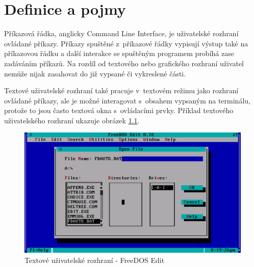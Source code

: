 \documentclass[thesis=M,czech]{FITthesis}[2012/06/26]
\begin{document}
\begin{introduction}



\end{introduction}

\chapter{Definice a pojmy}

Příkazová řádka, anglicky Command Line Interface, je uživatelské rozhraní ovládané příkazy. Příkazy spuštěné z~příkazové řádky vypisují výstup také na příkazovou řádku a další interakce se spuštěným programem probíhá zase zadáváním příkazů. Na rozdíl od textového nebo grafického rozhraní uživatel nemůže nijak zasahovat do již vypsané či vykreslené části.

Textové uživatelské rozhraní také pracuje v~textovém režimu jako rozhraní ovládané příkazy, ale je možné interagovat s~obsahem vypsaným na terminálu, protože to jsou často textová okna s~ovládacími prvky. Příklad textového uživatelského rozhraní ukazuje obrázek \ref{fig:tui}.

\begin{figure}
	\includegraphics[width=1.0\textwidth]{./images/TUI}
	\caption{Textové uživatelské rozhraní - FreeDOS Edit \cite{fdedit}}
	\label{fig:tui}
\end{figure}
\end{document}
